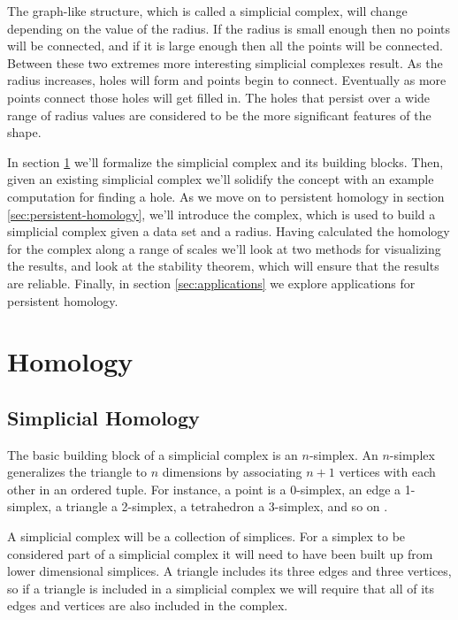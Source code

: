 The graph-like structure, which is called a simplicial complex, will change depending on the value of the radius.
If the radius is small enough then no points will be connected, and if it is large enough then all the points will be connected.
Between these two extremes more interesting simplicial complexes result.
As the radius increases, holes will form and points begin to connect.
Eventually as more points connect those holes will get filled in.
The holes that persist over a wide range of radius values are considered to be the more significant features of the shape.

In section \ref{sec:homology} we'll formalize the simplicial complex and its building blocks.
Then, given an existing simplicial complex we'll solidify the concept with an example computation for finding a hole.
As we move on to persistent homology in section \ref{sec:persistent-homology}, we'll introduce the \cech complex, which is used to build a simplicial complex given a data set and a radius.
Having calculated the homology for the \cech complex along a range of scales we'll look at two methods for visualizing the results, and  look at the stability theorem, which will ensure that the results are reliable.
Finally, in section \ref{sec:applications} we  explore applications for persistent homology.

\section{Homology}\label{sec:homology}

\subsection{Simplicial Homology}\label{sec:simplicial-homology}

The basic building block of a simplicial complex is an \(n\)-simplex. %
An \(n\)-simplex generalizes the triangle to \(n\) dimensions by associating \(n+1\) vertices with each other in an ordered tuple.
For instance, a point is a 0-simplex, an edge a 1-simplex, a triangle a 2-simplex, a tetrahedron a 3-simplex, and so on .

\begin{figure}
    
    \caption{}
    \label{fig:basic-simplices}
\end{figure}

A simplicial complex will be a collection of simplices.
For a simplex to be considered part of a simplicial complex it will need to have been built up from lower dimensional simplices.
A triangle includes its three edges and three vertices, so if a triangle is included in a simplicial complex we will require that all of its edges and vertices are also included in the complex.

